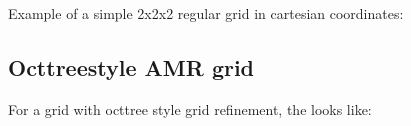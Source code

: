 \documentclass[letterpaper,10pt,english]{sphinxmanual}
\begin{document}
Example of a simple 2x2x2 regular grid in cartesian coordinates:

\begin{sphinxVerbatim}[commandchars=\\\{\}]
    
    
   
   
   
\end{sphinxVerbatim}


\subsection{Oct\sphinxhyphen{}tree\sphinxhyphen{}style AMR grid}
\label{\detokenize{inputoutputfiles:oct-tree-style-amr-grid}}\label{\detokenize{inputoutputfiles:sec-amr-grid-oct-tree}}
For a grid with oct\sphinxhyphen{}tree style grid refinement, the  looks like:
\end{document}
